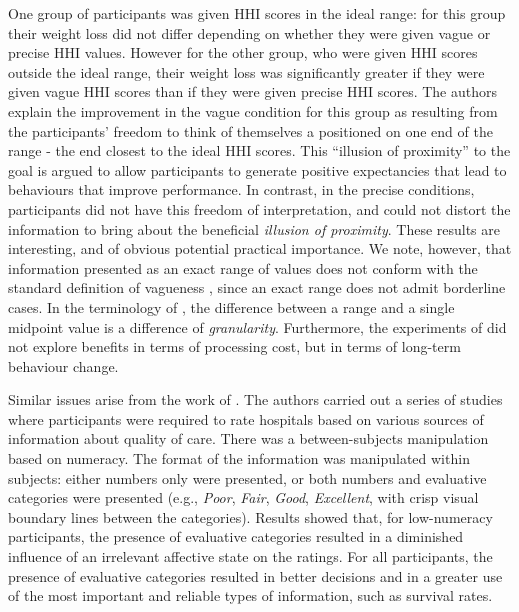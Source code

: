 \documentclass[
a4paper 
, doc
, longtable
]{apa6}
\begin{document}
One group of participants was given HHI scores in the ideal range: for this group their weight loss did not differ depending on whether they were given vague or precise HHI values. However for the other group, who were given HHI scores outside the ideal range, their weight loss was significantly greater if they were given vague HHI scores than if they were given precise HHI scores. The authors explain the improvement in the vague condition for this group as resulting from the participants' freedom to think of themselves a positioned on one end of the range - the end closest to the ideal HHI scores. This ``illusion of proximity'' \cite[][p.~4]{Mishra01042011} to the goal is argued to allow participants to generate positive expectancies that lead to behaviours that improve performance. In contrast, in the precise conditions, participants did not have this freedom of interpretation, and could not distort the information to bring about the beneficial \emph{illusion of proximity}. These results are interesting, and of obvious potential practical importance. We note, however, that information presented as an exact range of values does not conform with the standard definition of vagueness \cite{keefe1997vagueness, EgreKlinedinst}, since an exact range does not admit borderline cases. In the terminology of \textcite{Hobbs85granularity}, the difference between a range and a single midpoint value is a difference of \emph{granularity}. Furthermore, the experiments of \textcite{Mishra01042011} did not explore benefits in terms of processing cost, but in terms of long-term behaviour change.

Similar issues arise from the work of \textcite{peters2009bringing}. The authors carried out a series of studies where participants were required to rate hospitals based on various sources of information about quality of care. There was a between-subjects manipulation based on numeracy. The format of the information was manipulated within subjects: either numbers only were presented, or both numbers and evaluative categories were presented (e.g., \emph{Poor}, \emph{Fair}, \emph{Good}, \emph{Excellent}, with crisp visual boundary lines between the categories). Results showed that, for low-numeracy participants, the presence of evaluative categories resulted in a diminished influence of an irrelevant affective state on the ratings. For all participants, the presence of evaluative categories resulted in better decisions and in a greater use of the most important and reliable types of information, such as survival rates. 
\end{document}
